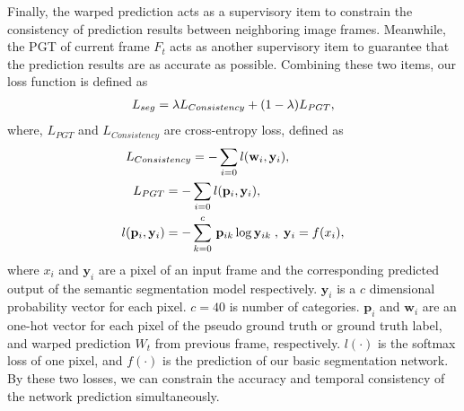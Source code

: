 Finally, the warped prediction acts as a supervisory item to constrain the consistency of prediction results between neighboring image frames.
%
Meanwhile, the PGT of current frame $F_t$ acts as another supervisory item to guarantee that the prediction results are as accurate as possible.
Combining these two items, our loss function is defined as
\begin{equation}
\centering
\begin{aligned}
L_{seg}= \lambda L_{Consistency} +(1-\lambda)L_{PGT},
\end{aligned}
\end{equation}
%
where, ${L_{PGT}}$ and ${L_{Consistency}}$ are cross-entropy loss, defined as
\begin{equation}
{
\vspace*{-0.6cm} 
\centering     
\begin{aligned} 
L_{Consistency} &= -\sum_{i=0} l(\mathbf{w}_i,\mathbf{y}_i),\\
L_{PGT} = -&\sum_{i=0} l(\mathbf{p}_i,\mathbf{y}_i), \\
l(\mathbf{p}_i,\mathbf{y}_i) = -&\sum_{k=0}^c \,\mathbf{p}_{ik}\log{\mathbf{y}_{ik}}\;,\; \mathbf{y}_{i} = f(x_{i}),\\
\end{aligned}
}
\end{equation}
%
where ${x_i}$ and ${\mathbf{y}_i}$ are a pixel of an input frame and the corresponding predicted output of the semantic segmentation model respectively. 
%
$\mathbf{y}_i$ is a $c$ dimensional probability vector for each pixel.
${c}=40$ is number of categories.
%
${\mathbf{p}_i}$ and ${\mathbf{w}_i}$ are an one-hot vector for each pixel of the pseudo ground truth or ground truth label, and warped prediction $W_{t}$ from previous frame, respectively. 
%
${l(\cdot)}$ is the softmax loss of one pixel, and ${f(\cdot)}$ is the prediction of our basic segmentation network. 
%
By these two losses, we can constrain the accuracy and temporal consistency of the network prediction simultaneously.
